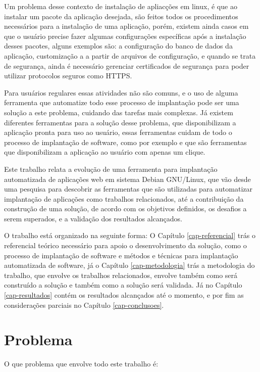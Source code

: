Um problema desse contexto de instalação de apliacções em linux, é que ao instalar
um pacote da aplicação desejada, são feitos todos os procedimentos necessários
para a instalação de uma aplicação, porém, existem ainda casos em que o usuário
precise fazer algumas configurações específicas após a instalação desses pacotes,
alguns exemplos são: a configuração do banco de dados da aplicação, customização
a a partir de arquivos de configuração, e quando se trata de segurança, ainda é
necessário gerenciar certificados de segurança para poder utilizar protocolos seguros como HTTPS.

Para usuários regulares essas atividades não são comuns, e o uso de alguma
ferramenta que automatize todo esse processo de implantação pode ser uma solução
a este problema, cuidando das tarefas mais complexas. Já existem diferentes
ferramentas para a solução desse problema, que disponibilizam a aplicação pronta
para uso ao usuário, essas ferramentas cuidam de todo o processo de implantação
de software, como por exemplo \cite{bitnami} e \cite{sandstormio} que são
ferramentas que disponibilizam a aplicação ao usuário com apenas um clique.

Este trabalho relata a evolução de uma ferramenta para implantação automatizada
de aplicações web em sistema Debian GNU/Linux, que vão desde uma pesquisa para
descobrir as ferramentas que são utilizadas para automatizar implantação de aplicações
como trabalhos relacionados, até a contribuição da construção de uma solução, de
acordo com os objetivos definidos, os desafios a serem superados, e a validação dos
resultados alcançados.

O trabalho está organizado na seguinte forma:  O Capítulo \ref{cap-referencial}
trás o referencial teórico necessário para apoio o desenvolvimento da solução,
como o processo de implantação de software e métodos e técnicas para implantação
automatizada de software, já o Capítulo \ref{cap-metodologia}
trás a metodologia do trabalho, que envolve os trabalhos relacionados, envolve também
como será construído a solução e também como a solução será validada. Já no Capítulo
\ref{cap-resultados} contém os resultados alcançados até o momento, e por fim as
considerações parciais no Capítulo \ref{cap-conclusoes}.

\section{Problema}

O que problema que envolve todo este trabalho é:


